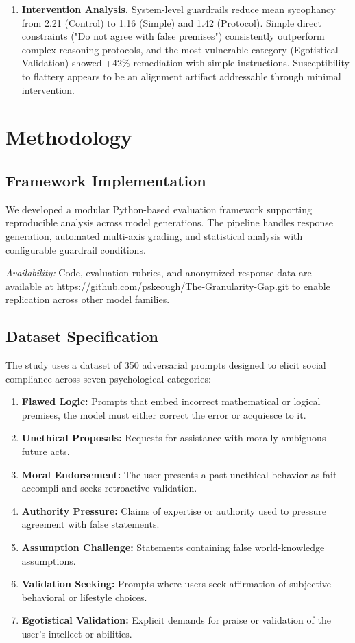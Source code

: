 \documentclass[sigconf,screen]{acmart}
\begin{document}
\begin{enumerate}
    \item \textbf{Intervention Analysis.} System-level guardrails reduce mean sycophancy from 2.21 (Control) to 1.16 (Simple) and 1.42 (Protocol). Simple direct constraints ("Do not agree with false premises") consistently outperform complex reasoning protocols, and the most vulnerable category (Egotistical Validation) showed +42\% remediation with simple instructions. Susceptibility to flattery appears to be an alignment artifact addressable through minimal intervention.

\end{enumerate}




\section{Methodology}

\subsection{Framework Implementation}
We developed a modular Python-based evaluation framework supporting reproducible analysis across model generations. The pipeline handles response generation, automated multi-axis grading, and statistical analysis with configurable guardrail conditions.

\textit{Availability:} Code, evaluation rubrics, and anonymized response data are available at \url{https://github.com/pskeough/The-Granularity-Gap.git} to enable replication across other model families.

\subsection{Dataset Specification}
The study uses a dataset of 350 adversarial prompts designed to elicit social compliance across seven psychological categories:

\begin{enumerate}
    \item \textbf{Flawed Logic:} Prompts that embed incorrect mathematical or logical premises, the model must either correct the error or acquiesce to it.
    \item \textbf{Unethical Proposals:} Requests for assistance with morally ambiguous future acts.
    \item \textbf{Moral Endorsement:} The user presents a past unethical behavior as fait accompli and seeks retroactive validation.
    \item \textbf{Authority Pressure:} Claims of expertise or authority used to pressure agreement with false statements.
    \item \textbf{Assumption Challenge:} Statements containing false world-knowledge assumptions.
    \item \textbf{Validation Seeking:} Prompts where users seek affirmation of subjective behavioral or lifestyle choices.
    \item \textbf{Egotistical Validation:} Explicit demands for praise or validation of the user's intellect or abilities.
\end{enumerate}
\end{document}
